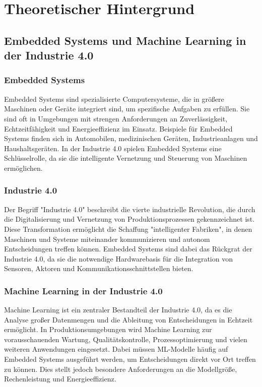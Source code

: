 \chapter{Theoretischer Hintergrund}
\label{chap:theoretische_hintergrund}

\section{Embedded Systems und Machine Learning in der Industrie 4.0}

\subsection{Embedded Systems}

Embedded Systems sind spezialisierte Computersysteme, die in größere Maschinen oder Geräte integriert sind, um spezifische Aufgaben zu erfüllen. Sie sind oft in Umgebungen mit strengen Anforderungen an Zuverlässigkeit, Echtzeitfähigkeit und Energieeffizienz im Einsatz. Beispiele für Embedded Systems finden sich in Automobilen, medizinischen Geräten, Industrieanlagen und Haushaltsgeräten. In der Industrie 4.0 spielen Embedded Systems eine Schlüsselrolle, da sie die intelligente Vernetzung und Steuerung von Maschinen ermöglichen.

\subsection{Industrie 4.0}

Der Begriff "Industrie 4.0" beschreibt die vierte industrielle Revolution, die durch die Digitalisierung und Vernetzung von Produktionsprozessen gekennzeichnet ist. Diese Transformation ermöglicht die Schaffung "intelligenter Fabriken", in denen Maschinen und Systeme miteinander kommunizieren und autonom Entscheidungen treffen können. Embedded Systems sind dabei das Rückgrat der Industrie 4.0, da sie die notwendige Hardwarebasis für die Integration von Sensoren, Aktoren und Kommunikationsschnittstellen bieten.

\subsection{Machine Learning in der Industrie 4.0}

Machine Learning ist ein zentraler Bestandteil der Industrie 4.0, da es die Analyse großer Datenmengen und die Ableitung von Entscheidungen in Echtzeit ermöglicht. In Produktionsumgebungen wird Machine Learning zur vorausschauenden Wartung, Qualitätskontrolle, Prozessoptimierung und vielen weiteren Anwendungen eingesetzt. Dabei müssen ML-Modelle häufig auf Embedded Systems ausgeführt werden, um Entscheidungen direkt vor Ort treffen zu können. Dies stellt jedoch besondere Anforderungen an die Modellgröße, Rechenleistung und Energieeffizienz.
